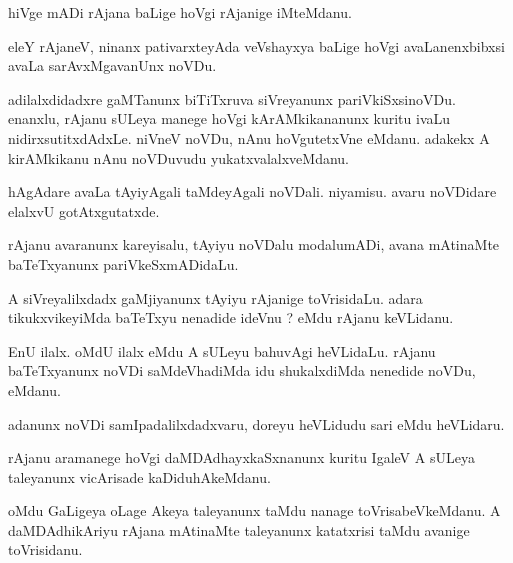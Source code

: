\documentclass{article}
\begin{document}
\begin{mn}
hiVge  mADi  rAjana  baLige  hoVgi  rAjanige  iMteMdanu.
\end{mn}

\begin{mn}
eleY  rAjaneV,  ninanx  pativarxteyAda  veVshayxya  baLige  hoVgi  avaLanenxbibxsi  avaLa  sarAvxMgavanUnx  noVDu.
\end{mn}

\begin{mn}
adilalxdidadxre  gaMTanunx  biTiTxruva  siVreyanunx  pariVkiSxsinoVDu.  enanxlu,  rAjanu  sULeya manege  
hoVgi  kArAMkikananunx  kuritu  ivaLu  nidirxsutitxdAdxLe.  niVneV  noVDu,  nAnu  hoVgutetxVne  eMdanu.  
adakekx  A  kirAMkikanu  nAnu  noVDuvudu  yukatxvalalxveMdanu.
\end{mn}

\begin{mn}
hAgAdare  avaLa  tAyiyAgali  taMdeyAgali  noVDali.  niyamisu.  avaru  noVDidare  elalxvU  gotAtxgutatxde.
\end{mn}

\begin{mn}
rAjanu  avaranunx  kareyisalu,  tAyiyu  noVDalu  modalumADi,  avana  mAtinaMte  baTeTxyanunx  pariVkeSxmADidaLu.
\end{mn}

\begin{mn}
A  siVreyalilxdadx  gaMjiyanunx  tAyiyu  rAjanige  toVrisidaLu.  adara  tikukxvikeyiMda  baTeTxyu  nenadide  ideVnu ?  
eMdu  rAjanu  keVLidanu.
\end{mn}

\begin{mn}
EnU  ilalx.  oMdU  ilalx  eMdu  A  sULeyu  bahuvAgi  heVLidaLu.  rAjanu  baTeTxyanunx  noVDi  saMdeVhadiMda  
idu  shukalxdiMda  nenedide  noVDu,  eMdanu.
\end{mn}

\begin{mn}
adanunx  noVDi  samIpadalilxdadxvaru,  doreyu  heVLidudu  sari  eMdu  heVLidaru.
\end{mn}

\begin{mn}
rAjanu  aramanege  hoVgi  daMDAdhayxkaSxnanunx  kuritu  IgaleV  A  sULeya  taleyanunx  vicArisade  kaDiduhAkeMdanu.
\end{mn}

\begin{mn}
oMdu  GaLigeya  oLage  Akeya  taleyanunx  taMdu  nanage  toVrisabeVkeMdanu.  A  daMDAdhikAriyu  rAjana  mAtinaMte  
taleyanunx  katatxrisi  taMdu  avanige  toVrisidanu.
\end{mn}
\end{document}
